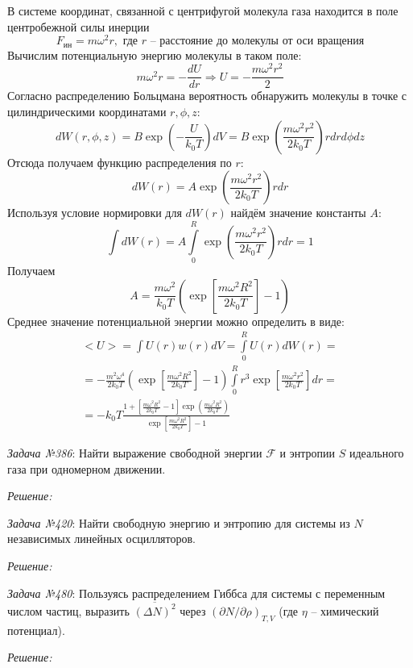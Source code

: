 \documentclass[14pt,final,titlepage,pscyr]{hedwork}
\begin{document}
В системе координат, связанной с центрифугой молекула газа находится в поле 
центробежной силы инерции
\[
	F_\text{ин} = m\omega^2 r, \text{ где } r \text{ -- расстояние до 
		молекулы от оси вращения}
\]
Вычислим потенциальную энергию молекулы в таком поле:
\[
	m\omega^2 r = -\frac{dU}{dr} \Rightarrow 
	U = -\frac{m\omega^2 r^2}{2}
\]
Согласно распределению Больцмана вероятность обнаружить молекулы в точке с 
цилиндрическими координатами \( r, \phi, z \):
\[
	dW(r,\phi,z) = B\exp\left(-\frac{U}{k_0 T}\right) dV = B
		\exp\left(\frac{m\omega^2 r^2}{2k_0 T}\right) r dr d\phi dz
\]
Отсюда получаем функцию распределения по \( r \):
\[
	dW(r) = A\exp\left(\frac{m\omega^2 r^2}{2k_0 T}\right) r dr
\]
Используя условие нормировки для \( dW(r) \) найдём значение константы \( A \):
\[
	\int dW(r) = A\int\limits_{0}^{R} 
		\exp\left( \frac{m\omega^2 r^2}{2k_0 T} \right) r dr = 1
\]
Получаем
\[
	A = \frac{m\omega^2}{k_0 T}\left( 
		\exp\left[\frac{m\omega^2 R^2}{2k_0 T}\right] - 1 \right)
\]
Среднее значение потенциальной энергии можно определить в виде:
\begin{gather}
	<U> = \int U(r) w(r) dV = \int\limits_{0}^{R} U(r) dW(r) = 
	\nonumber \\ =
		-\frac{m^2 \omega^4}{2k_0 T}\left( 
		\exp\left[\frac{m\omega^2 R^2}{2k_0 T}\right] - 1 \right)
		\int\limits_{0}^{R} r^3 \exp\left[ 
		\frac{m\omega^2 r^2}{2k_0 T} \right] dr = \nonumber \\ =
		-k_0 T \frac{1 + 
			\left[\frac{m\omega^2 R^2}{2k_0 T} - 1 \right]
			\exp\left( \frac{m\omega^2 R^2}{2k_0 T} \right)}
			{\exp\left[\frac{m\omega^2 R^2}{2k_0 T}\right] - 1}
	\nonumber
\end{gather}
\newpage

\emph{Задача №386}: Найти выражение свободной энергии \( \mathcal{F} \) и 
энтропии \( S \) идеального газа при одномерном движении.

\emph{Решение:}
\newpage

\emph{Задача №420}: Найти свободную энергию и энтропию для системы из \( N \) 
независимых линейных осцилляторов.

\emph{Решение:}
\newpage

\emph{Задача №480}: Пользуясь распределением Гиббса для системы с переменным 
числом частиц, выразить \( \overline{(\Delta N)^2} \) через 
\( \left( \partial N / \partial \rho \right)_{T,V} \) (где \( \eta \) -- 
химический потенциал).

\emph{Решение:}
\newpage
\end{document}
